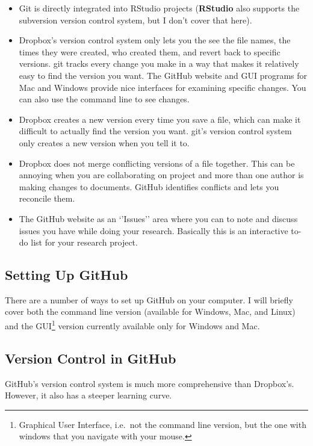\documentclass[ChapterTOCs,krantz1]{krantz}\usepackage{graphicx, color}
\begin{document}
\begin{itemize}
\item
  Git is directly integrated into RStudio projects
  (\textbf{RStudio} also supports the subversion version
  control system, but I don't cover that here).
\item
  Dropbox's version control system only lets you the see the
  file names, the times they were created, who created them, and revert
  back to specific versions. git tracks every change you make
  in a way that makes it relatively easy to find the version you want.
  The GitHub website and GUI programs for Mac and Windows
  provide nice interfaces for examining specific changes. You can also
  use the command line to see changes.
\item
  Dropbox creates a new version every time you save a file,
  which can make it difficult to actually find the version you want.
  git's version control system only creates a new version when
  you tell it to.
\item
  Dropbox does not merge conflicting versions of a file
  together. This can be annoying when you are collaborating on project
  and more than one author is making changes to documents.
  GitHub identifies conflicts and lets you reconcile them.
\item
  The GitHub website as an `'Issues'' area where you can to
  note and discuss issues you have while doing your research. Basically
  this is an interactive to-do list for your research project.
\end{itemize}

\subsection{Setting Up GitHub}

There are a number of ways to set up GitHub on your computer. I
will briefly cover both the command line version (available for Windows,
Mac, and Linux) and the GUI\footnote{Graphical User Interface, i.e.~not
  the command line version, but the one with windows that you navigate
  with your mouse.} version currently available only for Windows and
Mac.

\subsection{Version Control in GitHub}

GitHub's version control system is much more comprehensive than Dropbox's. However, it also has a steeper learning curve.
\end{document}
